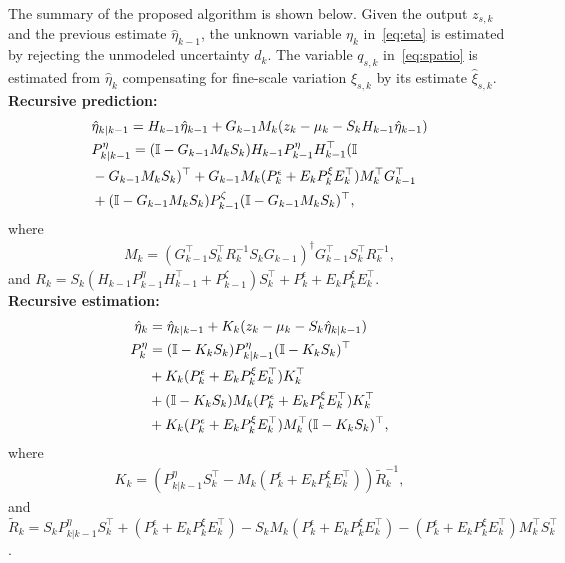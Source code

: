 \documentclass[letterpaper, 10 pt, conference]{ieeeconf}
\begin{document}
The summary of the proposed algorithm is shown below. Given the output $z_{s,k}$ and the previous estimate $\hat{\eta}_{k-1}$, the unknown variable $\eta_k$ in~\eqref{eq:eta} is estimated by rejecting the unmodeled uncertainty $d_k$.
The variable $q_{s,k}$ in~\eqref{eq:spatio} is estimated from $\hat{\eta}_{k}$ compensating for fine-scale variation $\xi_{s,k}$ by its estimate $\hat{\xi}_{s,k}$.\\
\textbf{Recursive prediction:}
\begin{align}
    &\hat{\eta}_{k|k-1} = H_{k-1}\hat{\eta}_{k-1}+G_{k-1}M_k(z_k -\mu_{k} - S_{k}H_{k-1}\hat{\eta}_{k-1})\nonumber\\
    &P_{k|k-1}^\eta = (\mathbb{I}-G_{k-1} M_kS_k)H_{k-1}P_{k-1}^\eta H_{k-1}^\top(\mathbb{I}\nonumber\\
    &-G_{k-1} M_kS_k)^\top +G_{k-1} M_k(P_k^\epsilon+E_kP_k^\xi E_k^\top)M_k^\top G_{k-1}^\top \nonumber\\
    &+ (\mathbb{I}-G_{k-1} M_kS_k)P_{k-1}^\zeta(\mathbb{I}-G_{k-1} M_kS_k)^\top,
    \label{eq:pred}
\end{align}
where
\begin{align}
    M_k = ( G_{k-1}^\top S_k^\top R_k^{-1}S_kG_{k-1} )^{\dagger} G_{k-1}^\top S_k^\top R_k^{-1},
    \label{eq:M}
\end{align}
and $R_k=S_k(H_{k-1}P_{k-1}^\eta H_{k-1}^\top+P_{k-1}^\zeta) S_k^\top+P_k^\epsilon + E_kP_k^{\xi}E_k^\top$.\\
\textbf{Recursive estimation:}
\begin{align}
    \hat{\eta}_k &= \hat{\eta}_{k|k-1} + K_k (z_k - \mu_{k}-S_{k}\hat{\eta}_{k|k-1})\nonumber\\
    P_k^\eta &= (\mathbb{I}-K_kS_k)P_{k|k-1}^\eta(\mathbb{I}-K_kS_k)^\top \nonumber\\
    &+ K_k (P_k^\epsilon+E_kP_k^\xi E_k^\top)K_k^\top \nonumber\\
    &+ (\mathbb{I}-K_kS_k)M_k(P_k^\epsilon+E_kP_k^\xi E_k^\top)K_k^\top \nonumber\\
    &+ K_k(P_k^\epsilon+E_kP_k^\xi E_k^\top)M_k^\top (\mathbb{I}-K_kS_k)^\top,
    \label{eq:estim}
\end{align}
where
\begin{align}
   K_k=(P^{\eta}_{k|k-1} S_{k}^\top - M_{k}  (P_k^\epsilon+E_kP_k^\xi E_k^\top))\tilde{R}_k^{-1} ,
   \label{eq:K}
\end{align}
and
$\tilde{R}_k=S_{k} P^{\eta}_{k|k-1} S_{k}^\top + (P_k^\epsilon+E_kP_k^\xi E_k^\top)-S_{k} M_{k}(P_k^\epsilon+E_kP_k^\xi E_k^\top)-(P_k^\epsilon+E_kP_k^\xi E_k^\top) M_{k}^\top S_{k}^\top$.\\
\end{document}
